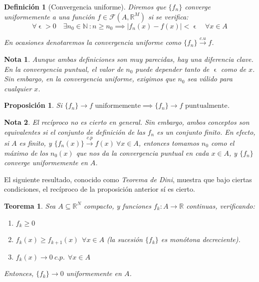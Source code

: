 \documentclass[11pt, a4paper]{article}
\newif\IfInSansMode
\let\epsilon\upvarepsilon
\providecommand{\abs}[1]{\lvert#1\rvert}
\newcommand{\R}{\mathbb{R}} \newcommand{\N}{\mathbb{N}}
\newcommand{\fn}{\{f_n\}}
\theoremstyle{theorem-style}
\newtheorem{nth}{Teorema}[section]
\newtheorem{nprop}{Proposición}[section]
\theoremstyle{definition-style}
\newtheorem{ndef}{Definición}[section]
\theoremstyle{remark-style}
\newtheorem*{nota}{Nota}
\theoremstyle{example-style}
\newenvironment{nlist}
{\begin{enumerate}
    \renewcommand\labelenumi{(\emph{\roman{enumi})}}}
  {\end{enumerate}}
\begin{document}
\begin{ndef}[Convergencia uniforme] Diremos que $\fn$ converge uniformemente a una función $f \in \mathcal{F}(A,\mathbb{R}^M)$ si se verifica:
  \[
    \forall \epsilon>0 \quad \exists n_0 \in \mathbb{N}\ : n\ge n_0\implies \abs{f_n(x)-f(x)} < \epsilon \quad \forall x \in A
  \]
  
  En ocasiones denotaremos la convergencia uniforme como $\fn \xrightarrow {c.u} f$.
\end{ndef}


\begin{nota}
  Aunque ambas definiciones son muy parecidas, hay una diferencia clave. En la convergencia puntual, el valor de $n_0$ puede depender tanto de $\epsilon$ como de $x$. Sin embargo, en la convergencia uniforme, exigimos que $n_0$ sea válido para cualquier $x$.
\end{nota}

\begin{nprop}
  Si $\fn\to f \text{ uniformemente} \implies \fn \to f \text{ puntualmente}$. 
\end{nprop}

  \begin{nota}
    El recíproco no es cierto en general. Sin embargo, ambos conceptos son equivalentes si el conjunto de definición de las $f_n$ es un conjunto finito. En efecto, si $A$ es finito, y $\{f_n(x)\} \xrightarrow {c.p} f(x) \ \forall x \in A$, entonces tomamos $n_0$ como el máximo de los $n_0(x)$ que nos da la convergencia puntual en cada $x \in A$, y $\fn$ converge uniformemente en $A$.
  \end{nota}	

El siguiente resultado, conocido como \textit{Teorema de Dini}, muestra que bajo ciertas condiciones, el recíproco de la proposición anterior sí es cierto.

\begin{nth}
  \label{1}
  Sea $A\subseteq \R^N$ compacto, y funciones $f_k : A \to \mathbb{R}$ continuas, verificando:

  \begin{nlist}
  \item $f_k \geq 0$
  \item $f_k(x) \geq f_{k+1}(x)\ \ \forall x \in A$ (la sucesión $\{f_k\}$ es monótona decreciente).
  \item $f_k(x) \to 0\ c.p.\ \ \forall x \in A$
  \end{nlist}

  Entonces, $\{f_k\} \to 0$ uniformemente en $A$.
\end{nth}
\end{document}
